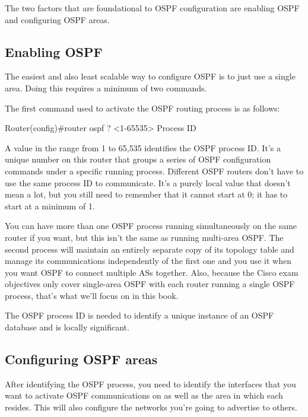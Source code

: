 The two factors that are foundational to OSPF configuration are enabling
OSPF and configuring OSPF areas.

\subsection{Enabling OSPF}

The easiest and also least scalable way to configure OSPF is to just use
a single area. Doing this requires a minimum of two commands.

The first command used to activate the OSPF routing process is as
follows:

\begin{cli}
Router(config)#router ospf ?
<1-65535> Process ID
\end{cli}

A value in the range from 1 to 65,535 identifies the OSPF process ID.
It's a unique number on this router that groups a series of OSPF
configuration commands under a specific running process. Different OSPF
routers don't have to use the same process ID to communicate. It's a
purely local value that doesn't mean a lot, but you still need to
remember that it cannot start at 0; it has to start at a minimum of 1.

\protect\hypertarget{c18.xhtmlux5cux23Page_754}{}{}You can have more
than one OSPF process running simultaneously on the same router if you
want, but this isn't the same as running multi-area OSPF. The second
process will maintain an entirely separate copy of its topology table
and manage its communications independently of the first one and you use
it when you want OSPF to connect multiple ASs together. Also, because
the Cisco exam objectives only cover single-area OSPF with each router
running a single OSPF process, that's what we'll focus on in this book.


\begin{note}
The OSPF process ID is needed to identify a unique instance of an OSPF database and is locally significant.
\end{note}


\subsection{Configuring OSPF areas}

After identifying the OSPF process, you need to identify the interfaces
that you want to activate OSPF communications on as well as the area in
which each resides. This will also configure the networks you're going
to advertise to others.

